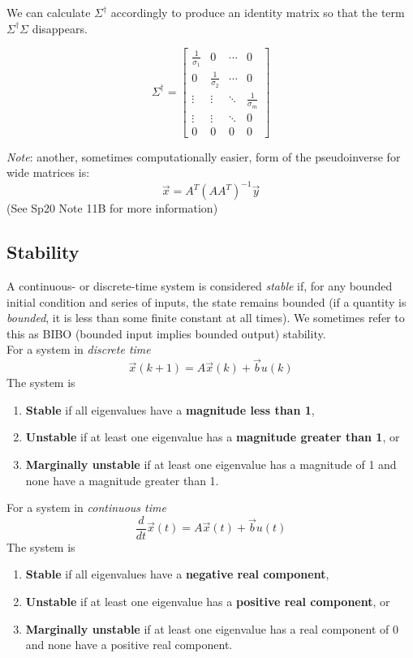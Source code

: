 We can calculate $\Sigma^{\dagger}$ accordingly to produce an identity matrix so that the term $\Sigma^{\dagger}\Sigma$ disappears.

$$\Sigma^{\dagger} = \begin{bmatrix} \frac{1}{\sigma_{1}} & 0 &  \cdots & 0 \\ 0 & \frac{1}{\sigma_{2}} & \cdots & 0 \\ \vdots & \vdots & \ddots & \frac{1}{\sigma_{m}} \\ 
    \vdots & \vdots & \ddots & 0 \\ 0 & 0 & 0 & 0 \end{bmatrix}$$

\textit{Note}: another, sometimes computationally easier, form of the pseudoinverse for wide matrices is:
$$\vec{x} = A^T(AA^T)^{-1}\vec{y}$$
(See Sp20 Note 11B for more information)

\subsection*{Stability}
A continuous- or discrete-time system is considered \textit{stable} if, for any bounded initial condition and series of inputs, the state remains bounded (if a quantity is \textit{bounded}, it is less than some finite constant at all times). We sometimes refer to this as BIBO (bounded input implies bounded output) stability. \\
\newline
For a system in \textit{discrete time}
$$\vec{x}(k + 1) = A\vec{x}(k) + \vec{b}u(k)$$
The system is
\begin{enumerate}
    \item \textbf{Stable} if all eigenvalues have a \textbf{magnitude less than 1},
    \item \textbf{Unstable} if at least one eigenvalue has a \textbf{magnitude greater than 1}, or
    \item \textbf{Marginally unstable} if at least one eigenvalue has a magnitude of 1 and none have a magnitude greater than 1.
\end{enumerate}

For a system in \textit{continuous time}
$$\frac{d}{dt} \vec{x}(t) = A\vec{x}(t) + \vec{b}u(t)$$
The system is
\begin{enumerate}
    \item \textbf{Stable} if all eigenvalues have a \textbf{negative real component},
    \item \textbf{Unstable} if at least one eigenvalue has a \textbf{positive real component}, or
    \item \textbf{Marginally unstable} if at least one eigenvalue has a real component of 0 and none have a positive real component.
\end{enumerate}


